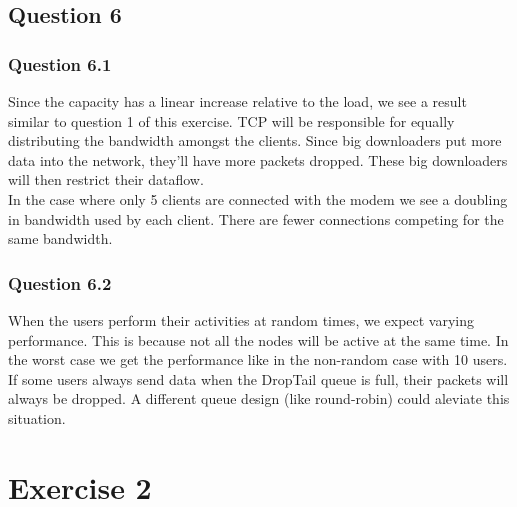 \documentclass[11pt,a4paper]{article}
\begin{document}
\subsection{Question 6}
\subsubsection{Question 6.1}
Since the capacity has a linear increase relative to the load, we see a result similar to question 1
of this exercise. TCP will be responsible for equally distributing the bandwidth amongst the clients. Since big downloaders put more data into the network, they'll have more packets dropped. These big downloaders will then restrict their dataflow.\\ 
In the case where only 5 clients are connected with the modem we see a doubling in bandwidth used by each client. There are fewer connections competing for the same bandwidth.

\subsubsection{Question 6.2}
When the users perform their activities at random times, we expect varying performance. This is because not all the nodes will be active at the same time. In the worst case we get the performance like in the non-random case with 10 users. \\
If some users always send data when the DropTail queue is full, their packets will always be dropped. A different queue design (like round-robin) could aleviate this situation.

\section{Exercise 2}
\end{document}
